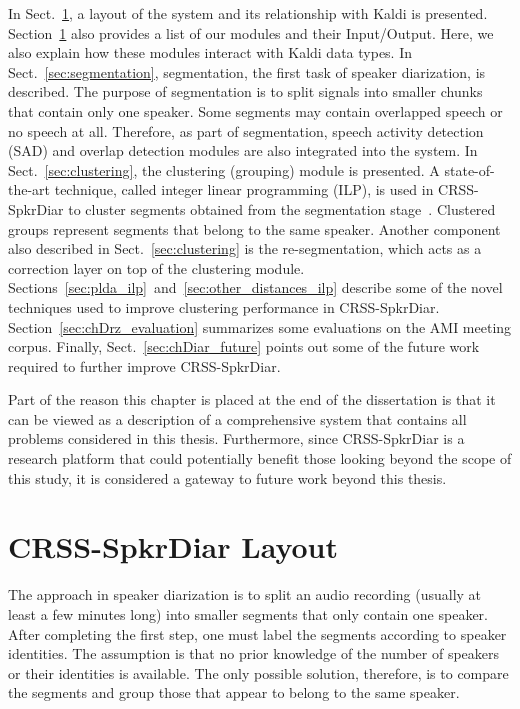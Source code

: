 In Sect.~\ref{sec:crssdiar_layout}, a layout of the system and its relationship with Kaldi is presented. 
Section~\ref{sec:crssdiar_layout} also provides a list of our modules and their Input/Output. 
Here, we also explain how these modules interact with Kaldi data types. 
In Sect.~\ref{sec:segmentation}, segmentation, the first task of speaker diarization, is described. 
The purpose of segmentation is to split signals into smaller chunks that contain only one speaker. 
Some segments may contain overlapped speech or no speech at all. 
Therefore, as part of segmentation, speech activity detection (SAD) and overlap detection modules are also integrated into the system. 
In Sect.~\ref{sec:clustering}, the clustering (grouping) module is presented. 
A state-of-the-art technique, called integer linear programming (ILP), is used in CRSS-SpkrDiar to cluster segments obtained from the segmentation stage~\cite{bredin2013ILP}. 
Clustered groups represent segments that belong to the same speaker. Another component also described in Sect.~\ref{sec:clustering} is the re-segmentation, which acts as a correction layer on top of the clustering module. 
Sections~\ref{sec:plda_ilp}~and~\ref{sec:other_distances_ilp} describe some of the novel techniques used to improve clustering performance in CRSS-SpkrDiar. 
Section~\ref{sec:chDrz_evaluation} summarizes some evaluations on the AMI meeting corpus. 
Finally, Sect.~\ref{sec:chDiar_future} points out some of the future work required to further improve CRSS-SpkrDiar. 

Part of the reason this chapter is placed at the end of the dissertation is that it can be viewed as a description of a comprehensive system that contains all problems considered in this thesis. 
Furthermore, since CRSS-SpkrDiar is a research platform that could potentially benefit those looking beyond the scope of this study, it is considered a gateway to future work beyond this thesis. 



 
\section{CRSS-SpkrDiar Layout}
\label{sec:crssdiar_layout}

The approach in speaker diarization is to split an audio recording (usually at least a few minutes long) into smaller segments that only contain one speaker.
After completing the first step, one must label the segments according to speaker identities. 
The assumption is that no prior knowledge of the number of speakers or their identities is available. 
The only possible solution, therefore, is to compare the segments and group those that appear to belong to the same speaker. 

